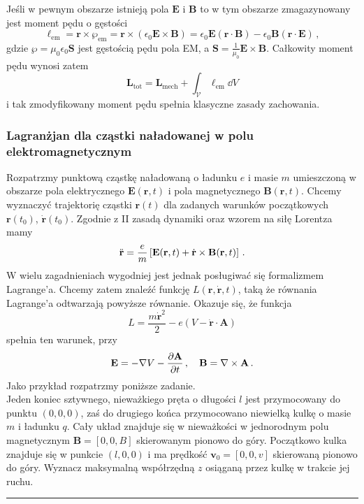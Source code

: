 \documentclass[../main.tex]{subfiles}
\begin{document}
Jeśli w pewnym obszarze istnieją pola \(\mathbf{E}\) i \(\mathbf{B}\) to w tym obszarze
zmagazynowany jest moment pędu o gęstości
\begin{equation*}
    \boldsymbol{\ell}_\text{em}=\mathbf{r}\times\boldsymbol{\wp}_\text{em}=\mathbf{r}\times(\epsilon_0\mathbf{E}\times\mathbf{B})=\epsilon_0\mathbf{E}(\mathbf{r}\cdot\mathbf{B})-\epsilon_0\mathbf{B}(\mathbf{r}\cdot\mathbf{E})\,,
\end{equation*}
gdzie \(\boldsymbol{\wp}=\mu_0\epsilon_0\mathbf{S}\) jest gęstością pędu pola EM, a
\(\mathbf{S}=\frac{1}{\mu_0}\mathbf{E}\times\mathbf{B}\). Całkowity moment pędu wynosi zatem
\begin{equation*}
    \mathbf{L}_\text{tot}=\mathbf{L}_\text{mech}+\int_\mathcal{V}\boldsymbol{\ell}_\text{em}\dd{V}
\end{equation*}
i tak zmodyfikowany moment pędu spełnia klasyczne zasady zachowania.
\subsubsection{Lagranżjan dla cząstki naładowanej w polu elektromagnetycznym}
Rozpatrzmy punktową cząstkę naładowaną o ładunku \(e\) i masie \(m\) umieszczoną w obszarze pola
elektrycznego \(\mathbf{E}(\mathbf{r},t)\) i pola magnetycznego \(\mathbf{B}(\mathbf{r},t)\). Chcemy
wyznaczyć trajektorię cząstki \(\mathbf{r}(t)\) dla zadanych warunków początkowych
\(\mathbf{r}(t_0)\), \(\dot{\mathbf{r}}(t_0)\). Zgodnie z II zasadą dynamiki oraz wzorem na siłę
Lorentza mamy
\begin{equation*}
    \Ddot{\mathbf{r}}=\frac{e}{m}\left[\mathbf{E}(\mathbf{r},t)+\dot{\mathbf{r}}\times\mathbf{B}(\mathbf{r},t)\right]\,.
\end{equation*}
W wielu zagadnieniach wygodniej jest jednak posługiwać się formalizmem Lagrange'a. Chcemy zatem
znaleźć funkcję \(L(\mathbf{r},\dot{\mathbf{r}},t)\), taką że równania Lagrange'a odtwarzają
powyższe równanie. Okazuje się, że funkcja
\begin{equation*}
    L=\frac{m\dot{\mathbf{r}}^2}{2}-e(V-\dot{\mathbf{r}}\cdot\mathbf{A})
\end{equation*}
spełnia ten warunek, przy
\begin{equation*}
    \mathbf{E}=-\nabla V-\pdv{\mathbf{A}}{t}\,,\quad \mathbf{B}=\nabla\times\mathbf{A}\,.
\end{equation*}
Jako przykład rozpatrzmy poniższe zadanie.\\

Jeden koniec sztywnego, nieważkiego pręta o długości \(l\) jest przymocowany do punktu \((0,0,0)\),
zaś do drugiego końca przymocowano niewielką kulkę o masie \(m\) i ładunku \(q\). Cały układ
znajduje się w nieważkości w jednorodnym polu magnetycznym \(\mathbf{B}=[0,0,B]\) skierowanym
pionowo do góry. Początkowo kulka znajduje się w punkcie \((l,0,0)\) i ma prędkość
\(\mathbf{v}_0=[0,0,v]\) skierowaną pionowo do góry. Wyznacz maksymalną współrzędną \(z\) osiąganą
przez kulkę w trakcie jej ruchu.\\
\noindent\rule{\linewidth}{1pt}\\
\end{document}
